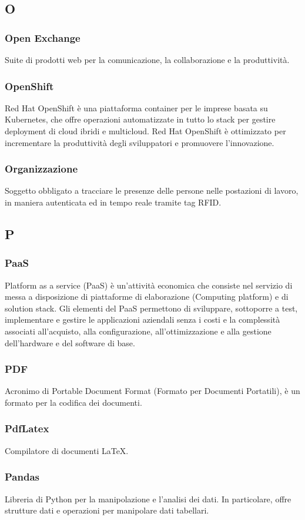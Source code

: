 \subsection*{O}
\subsubsection*{Open Exchange} Suite di prodotti web per la comunicazione, la collaborazione e la produttività.
\subsubsection*{OpenShift} Red Hat OpenShift è una piattaforma container per le imprese basata su Kubernetes, che offre operazioni automatizzate in tutto lo stack per gestire deployment di cloud ibridi e multicloud. Red Hat OpenShift è ottimizzato per incrementare la produttività degli sviluppatori e promuovere l'innovazione. 
\subsubsection*{Organizzazione} Soggetto obbligato a tracciare le presenze delle persone nelle postazioni di lavoro, in maniera autenticata ed in tempo reale tramite tag RFID. 
\subsection*{P}
\subsubsection*{PaaS} Platform as a service (PaaS) è un'attività economica che consiste nel servizio di messa a disposizione di piattaforme di elaborazione (Computing platform) e di solution stack. Gli elementi del PaaS permettono di sviluppare, sottoporre a test, implementare e gestire le applicazioni aziendali senza i costi e la complessità associati all'acquisto, alla configurazione, all'ottimizzazione e alla gestione dell'hardware e del software di base.
\subsubsection*{PDF} Acronimo di Portable Document Format (Formato per Documenti Portatili), è un formato per la codifica dei documenti.
\subsubsection*{PdfLatex} Compilatore di documenti \LaTeX.
\subsubsection*{Pandas} Libreria di Python per la manipolazione e l'analisi dei dati. In particolare, offre strutture dati e operazioni per manipolare dati tabellari.

